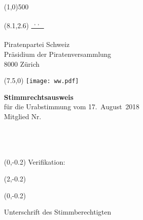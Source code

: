 \documentclass[11pt, a4paper]{scrartcl}
\newcommand{\votingdate}{17.~August~2018}
\begin{document}
{\begin{minipage}[t][13.42cm][t]{\textwidth}
\end{minipage}

\line(1,0){500}
\vspace{1cm}

\begin{minipage}[t][12.5cm][t]{\textwidth}

\begin{textblock}{9}(8.1,2.6)
\underline{\textsuperscript*{ \givenname~\surname, \street, \postalcode~\location }} \\
\vspace{-0.3cm} \\
Piratenpartei Schweiz \\
Präsidium der Piratenversammlung \\
8000 Zürich
\end{textblock}

\begin{textblock}{6}(7.5,0)
\texttt{[image: ww.pdf]}
\end{textblock}

{\LARGE\textbf{Stimmrechtsausweis}} \\
für die Urabstimmung vom \votingdate{} \\

Mitglied Nr. \textbf{\id}   \\
\givenname~\surname         \\
\street                     \\
\postalcode~\location       \\
%

\begin{textblock}{6}(0,-0.2)
Verifikation:
\end{textblock}

\begin{textblock}{4}(2,-0.2)
\raggedright
\code
\end{textblock}

\vspace{4cm}

\begin{textblock}{6}(0,-0.2)
\begin{framed}
Unterschrift des Stimmberechtigten \\
\vspace{1.5cm} ~ \\
\end{framed}
\end{textblock}


\end{minipage}}
\end{document}
